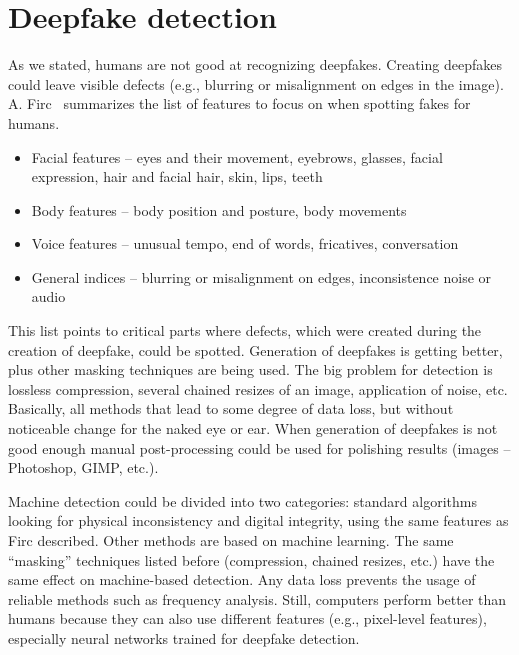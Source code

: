 \chapter{Deepfake detection}
\label{chapter:deepfake_detectoin}

As we stated, humans are not good at recognizing deepfakes. Creating deepfakes could leave visible defects (e.g., blurring or misalignment on edges in the image). A. Firc~\cite{ApplicabilityOfDeepfakes} summarizes the list of features to focus on when spotting fakes for humans.

\begin{itemize}
    \item Facial features – eyes and their movement, eyebrows, glasses, facial expression, hair and facial hair, skin, lips, teeth
    \item Body features – body position and posture, body movements
    \item Voice features – unusual tempo, end of words, fricatives, conversation
    \item General indices – blurring or misalignment on edges, inconsistence noise or audio
\end{itemize}
	
This list points to critical parts where defects, which were created during the creation of deepfake, could be spotted. Generation of deepfakes is getting better, plus other masking techniques are being used. The big problem for detection is lossless compression, several chained resizes of an image, application of noise, etc. Basically, all methods that lead to some degree of data loss, but without noticeable change for the naked eye or ear. When generation of deepfakes is not good enough manual post-processing could be used for polishing results (images – Photoshop, GIMP, etc.). 

Machine detection could be divided into two categories: standard algorithms looking for physical inconsistency and digital integrity, using the same features as Firc described. Other methods are based on machine learning. The same “masking” techniques listed before (compression, chained resizes, etc.) have the same effect on machine-based detection. Any data loss prevents the usage of reliable methods such as frequency analysis. Still, computers perform better than humans because they can also use different features (e.g., pixel-level features), especially neural networks trained for deepfake detection.~\cite{MediaForensicsandDeepFakes}

